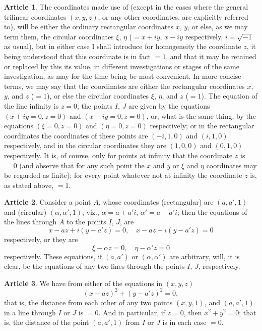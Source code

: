 \documentclass[11pt,a4paper]{article}
\theoremstyle{definition}
\newtheorem{art}{Article}
\begin{document}
\begin{art}
The coordinates made use of (except in the cases where the general trilinear coordinates $(x, y, z)$, or any other coordinates, are explicitly referred to), will be either the ordinary rectangular coordinates $x$, $y$, or else, as we may term them, the circular coordinates $\xi$, $\eta$ ($= x + iy$, $x - iy$ respectively, $i = \sqrt{-1}$ as usual), but in either case I shall introduce for homogeneity the coordinate $z$, it being understood that this coordinate is in fact $= 1$, and that it may be retained or replaced by this its value, in different investigations or stages of the same investigation, as may for the time being be most convenient. In more concise terms, we may say that the coordinates are either the rectangular coordinates $x$, $y$, and $z$ ($= 1$), or else the circular coordinates $\xi$, $\eta$, and $z$ ($= 1$). The equation of the line infinity is $z = 0$; the points $I$, $J$ are given by the equations $(x + iy = 0, z = 0)$ and $(x - iy = 0, z = 0)$, or, what is the same thing, by the equations $(\xi = 0, z = 0)$ and $(\eta = 0, z = 0)$ respectively; or in the rectangular coordinates the coordinates of these points are $(-i, 1, 0)$ and $(i, 1, 0)$ respectively, and in the circular coordinates they are $(1, 0, 0)$ and $(0, 1, 0)$ respectively. It is, of course, only for points at infinity that the coordinate $z$ is $= 0$ (and observe that for any such point the $x$ and $y$ or $\xi$ and $\eta$ coordinates may be regarded as finite); for every point whatever not at infinity the coordinate $z$ is, as stated above, $= 1$.
\end{art}

\begin{art}
Consider a point $A$, whose coordinates (rectangular) are $(a, a', 1)$ and (circular) $(\alpha, \alpha', 1)$, viz., $\alpha = a + a'i$, $\alpha' = a - a'i$; then the equations of the lines through $A$ to the points $I$, $J$, are
\[
x - az + i(y - a'z) = 0, \quad x - az - i(y - a'z) = 0
\]
respectively, or they are
\[
\xi - \alpha z = 0, \quad \eta - \alpha' z = 0
\]
respectively. These equations, if $(a, a')$ or $(\alpha, \alpha')$ are arbitrary, will, it is clear, be the equations of any two lines through the points $I$, $J$, respectively.
\end{art}

\begin{art}
We have from either of the equations in $(x, y, z)$
\[
(x - az)^{2} + (y - a'z)^{2} = 0,
\]
that is, the distance from each other of any two points $(x, y, 1)$, and $(a, a', 1)$ in a line through $I$ or $J$ is $= 0$. And in particular, if $z = 0$, then $x^{2} + y^{2} = 0$; that is, the distance of the point $(a, a', 1)$ from $I$ or $J$ is in each case $= 0$.
\end{art}
\end{document}
